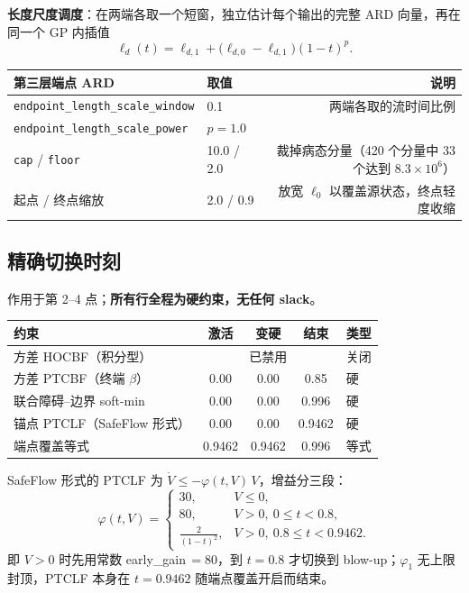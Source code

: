 \documentclass[11pt,a4paper]{ctexart}
\newcommand{\cf}[1]{\texttt{\small #1}}
\begin{document}
\noindent \textbf{长度尺度调度}：在两端各取一个短窗，独立估计每个输出的完整 ARD 向量，再在同一个 GP 内插值
\[
\ell_d(t)=\ell_{d,1}+\bigl(\ell_{d,0}-\ell_{d,1}\bigr)(1-t)^{p}.
\]

\begin{center}
\small
\begin{tabularx}{\textwidth}{@{}p{5.6cm}p{2.2cm}R@{}}
\toprule
\textbf{第三层端点 ARD} & \textbf{取值} & \textbf{说明} \\
\midrule
\cf{endpoint\_length\_scale\_window} & 0.1 & 两端各取的流时间比例 \\
\cf{endpoint\_length\_scale\_power} & $p=1.0$ & \\
\cf{cap} / \cf{floor} & 10.0 / 2.0 & 裁掉病态分量（420 个分量中 33 个达到 $8.3\times10^{6}$）\\
起点 / 终点缩放 & 2.0 / 0.9 & 放宽 $\ell_0$ 以覆盖源状态，终点轻度收缩 \\
\bottomrule
\end{tabularx}
\end{center}

\subsection{精确切换时刻}
作用于第 2--4 点；\textbf{所有行全程为硬约束，无任何 slack}。

\begin{center}
\small
\begin{tabular}{@{}lcccl@{}}
\toprule
\textbf{约束} & \textbf{激活} & \textbf{变硬} & \textbf{结束} & \textbf{类型} \\
\midrule
方差 HOCBF（积分型） & \multicolumn{3}{c}{已禁用} & 关闭 \\
方差 PTCBF（终端 $\beta$） & 0.00 & 0.00 & 0.85 & 硬 \\
联合障碍--边界 soft-min & 0.00 & 0.00 & 0.996 & 硬 \\
锚点 PTCLF（SafeFlow 形式） & 0.00 & 0.00 & 0.9462 & 硬 \\
端点覆盖等式 & 0.9462 & 0.9462 & 0.996 & 等式 \\
\bottomrule
\end{tabular}
\end{center}

\noindent SafeFlow 形式的 PTCLF 为 $\dot V\le -\varphi(t,V)\,V$，增益分三段：
\[
\varphi(t,V)=
\begin{cases}
30, & V\le 0,\\
80, & V>0,\ 0\le t<0.8,\\
\displaystyle\frac{2}{(1-t)^{2}}, & V>0,\ 0.8\le t<0.9462.
\end{cases}
\]
即 $V>0$ 时先用常数 early\_gain$\,=80$，到 $t=0.8$ 才切换到 blow-up；$\varphi_1$ 无上限封顶，PTCLF 本身在 $t=0.9462$ 随端点覆盖开启而结束。
\end{document}
